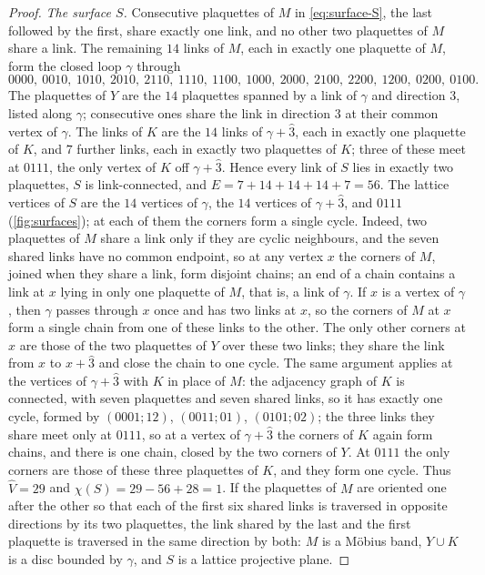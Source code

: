 \documentclass[11pt,a4paper]{amsart}
\theoremstyle{definition}
\theoremstyle{remark}
\numberwithin{equation}{section}
\begin{document}
\begin{proof}
\emph{The surface $S$.} Consecutive plaquettes of $M$ in \eqref{eq:surface-S}, the last followed by the first, share exactly one link, and no other two plaquettes of $M$ share a link. The remaining $14$ links of $M$, each in exactly one plaquette of $M$, form the closed loop $\gamma$ through
\[
0000,\ 0010,\ 1010,\ 2010,\ 2110,\ 1110,\ 1100,\ 1000,\ 2000,\ 2100,\ 2200,\ 1200,\ 0200,\ 0100.
\]
The plaquettes of $Y$ are the $14$ plaquettes spanned by a link of $\gamma$ and direction $3$, listed along $\gamma$; consecutive ones share the link in direction $3$ at their common vertex of $\gamma$. The links of $K$ are the $14$ links of $\gamma+\hat3$, each in exactly one plaquette of $K$, and $7$ further links, each in exactly two plaquettes of $K$; three of these meet at $0111$, the only vertex of $K$ off $\gamma+\hat3$. Hence every link of $S$ lies in exactly two plaquettes, $S$ is link-connected, and $E=7+14+14+14+7=56$. The lattice vertices of $S$ are the $14$ vertices of $\gamma$, the $14$ vertices of $\gamma+\hat3$, and $0111$ (\cref{fig:surfaces}); at each of them the corners form a single cycle. Indeed, two plaquettes of $M$ share a link only if they are cyclic neighbours, and the seven shared links have no common endpoint, so at any vertex $x$ the corners of $M$, joined when they share a link, form disjoint chains; an end of a chain contains a link at $x$ lying in only one plaquette of $M$, that is, a link of $\gamma$. If $x$ is a vertex of $\gamma$, then $\gamma$ passes through $x$ once and has two links at $x$, so the corners of $M$ at $x$ form a single chain from one of these links to the other. The only other corners at $x$ are those of the two plaquettes of $Y$ over these two links; they share the link from $x$ to $x+\hat3$ and close the chain to one cycle. The same argument applies at the vertices of $\gamma+\hat3$ with $K$ in place of $M$: the adjacency graph of $K$ is connected, with seven plaquettes and seven shared links, so it has exactly one cycle, formed by $(0001;12)$, $(0011;01)$, $(0101;02)$; the three links they share meet only at $0111$, so at a vertex of $\gamma+\hat3$ the corners of $K$ again form chains, and there is one chain, closed by the two corners of $Y$. At $0111$ the only corners are those of these three plaquettes of $K$, and they form one cycle. Thus $\hat V=29$ and $\chi(S)=29-56+28=1$. If the plaquettes of $M$ are oriented one after the other so that each of the first six shared links is traversed in opposite directions by its two plaquettes, the link shared by the last and the first plaquette is traversed in the same direction by both: $M$ is a M\"obius band, $Y\cup K$ is a disc bounded by $\gamma$, and $S$ is a lattice projective plane.


\end{proof}
\end{document}
